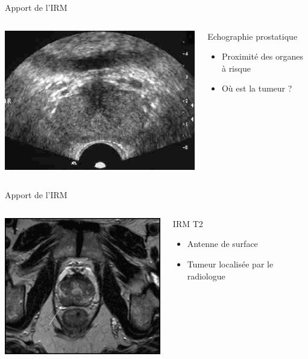 \documentclass{beamer}
\begin{document}
\begin{frame}{Apport de l'IRM}
  \centering
  \begin{columns}[T]
 \begin{column}{0.5\textwidth}
\includegraphics[height=0.5\textheight]{images/echo_prostate.jpg}
 \end{column}
 \begin{column}{0.5\textwidth}
\begin{block}{Echographie prostatique}
\begin{itemize}
  \item Proximité des organes à risque
  \item Où est la tumeur ?
  \end{itemize}
\end{block}
\end{column}
\end{columns} 
\end{frame}

\begin{frame}{Apport de l'IRM}
  \centering
  \begin{columns}[T]
 \begin{column}{0.5\textwidth}
\includegraphics[height=0.5\textheight]{images/irm_prostate.jpg}
 \end{column}
 \begin{column}{0.5\textwidth}
\begin{block}{IRM T2}
\begin{itemize}
  \item Antenne de surface
  \item Tumeur localisée par le radiologue
  \end{itemize}
\end{block}
\end{column}
\end{columns} 
\end{frame}
\end{document}
